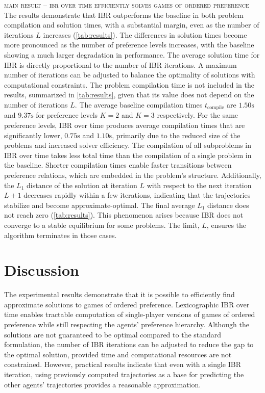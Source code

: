\smallskip \noindent
\textsc{main result}  -- \textsc{ibr over time efficiently solves games of ordered preference} \quad
The results demonstrate that IBR outperforms the baseline
in both problem compilation and solution times,
with a substantial margin, even
as the number of iterations \(L\) increases (\cref{tab:results}).
The differences in solution times become more pronounced
as the number of preference levels increases,
with the baseline showing a much larger degradation in performance.
The average solution time for IBR is directly proportional
to the number of IBR iterations. A maximum number
of iterations can be adjusted to balance the optimality
of solutions with computational constraints.
The problem compilation time is not included in the results,
summarized in \cref{tab:results},
given that its value does not depend on the number of iterations \(L\).
The average baseline compilation times \(t_\text{compile}\) are \(1.50\si{\second}\) and \(9.37\si{\second}\) for preference levels \(K = 2\) and \(K = 3\) respectively.
For the same preference levels, IBR over time produces average compilation times
that are significantly lower, \(0.75\si{\second}\) and
\(1.10\si{\second}\),
primarily due to the reduced size of the problems
and increased solver efficiency.
The compilation of all subproblems in IBR over time takes
less total time than the compilation of a single problem in the baseline.
Shorter compilation times enable faster transitions
between preference relations,
which are embedded in the problem's structure.
Additionally, the \(L_1\) distance of the solution at iteration \(L\) with respect to
the next iteration \(L+1\) decreases rapidly
within a few iterations, indicating that the trajectories stabilize and become approximate-optimal.
The final average \(L_1\) distance does not reach zero (\cref{tab:results}).
This phenomenon arises because IBR does not converge to a stable equilibrium
for some problems.
The limit, \(L\), ensures the algorithm terminates in those cases.

\section{Discussion}

The experimental results demonstrate
that it is possible to efficiently find approximate solutions
to games of ordered preference. %
Lexicographic IBR over time enables tractable computation
of single-player versions of games
of ordered preference while still respecting the agents' preference hierarchy.
Although the solutions are not guaranteed
to be optimal compared to the standard formulation, the number of IBR iterations can be adjusted
to reduce the gap to the optimal solution, provided time and computational resources are not constrained.
However, practical results indicate that even with a single IBR iteration, using previously computed trajectories as a base for predicting the other agents' trajectories provides a reasonable approximation.

